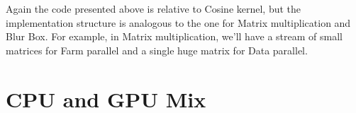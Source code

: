 	Again the code presented above is relative to Cosine kernel, but the implementation structure is analogous to the one for Matrix multiplication and Blur Box.
	For example, in Matrix multiplication, we'll have a stream of small matrices for Farm parallel and a single huge matrix for Data parallel.
	
	
	
\section{CPU and GPU Mix}
